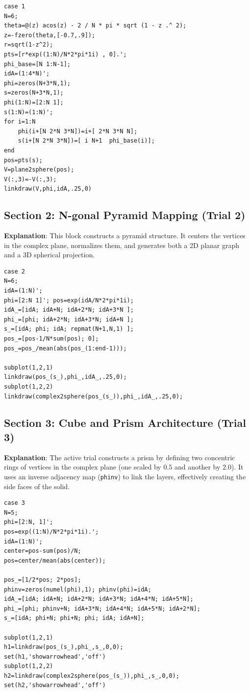 \begin{lstlisting}
case 1 
N=6; 
theta=@(z) acos(z) - 2 / N * pi * sqrt (1 - z .^ 2);
z=-fzero(theta,[-0.7,.9]);
r=sqrt(1-z^2);
pts=[r*exp((1:N)/N*2*pi*1i) , 0].';
phi_base=[N 1:N-1];
idA=(1:4*N)';
phi=zeros(N+3*N,1);
s=zeros(N+3*N,1);
phi(1:N)=[2:N 1];
s(1:N)=(1:N)';
for i=1:N
    phi(i+[N 2*N 3*N])=i+[ 2*N 3*N N];
    s(i+[N 2*N 3*N])=[ i N+1  phi_base(i)];
end
pos=pts(s);
V=plane2sphere(pos);
V(:,3)=-V(:,3);
linkdraw(V,phi,idA,.25,0)
\end{lstlisting}

\subsection{Section 2: N-gonal Pyramid Mapping (Trial 2)}
\textbf{Explanation}: This block constructs a pyramid structure. It centers the vertices in the complex plane, normalizes them, and generates both a 2D planar graph and a 3D spherical projection.

\begin{lstlisting}
case 2 
N=6;
idA=(1:N)';
phi=[2:N 1]'; pos=exp(idA/N*2*pi*1i);
idA_=[idA; idA+N; idA+2*N; idA+3*N ];
phi_=[phi; idA+2*N; idA+3*N; idA+N ];
s_=[idA; phi; idA; repmat(N+1,N,1) ];
pos_=[pos-1/N*sum(pos); 0];
pos_=pos_/mean(abs(pos_(1:end-1)));

subplot(1,2,1)
linkdraw(pos_(s_),phi_,idA_,.25,0);
subplot(1,2,2)
linkdraw(complex2sphere(pos_(s_)),phi_,idA_,.25,0);
\end{lstlisting}

\subsection{Section 3: Cube and Prism Architecture (Trial 3)}
\textbf{Explanation}: The active trial constructs a prism by defining two concentric rings of vertices in the complex plane (one scaled by $0.5$ and another by $2.0$). It uses an inverse adjacency map (\texttt{phinv}) to link the layers, effectively creating the side faces of the solid.

\begin{lstlisting}
case 3 
N=5;
phi=[2:N, 1]';
pos=exp((1:N)/N*2*pi*1i).';
idA=(1:N)';
center=pos-sum(pos)/N;
pos=center/mean(abs(center));

pos_=[1/2*pos; 2*pos];
phinv=zeros(numel(phi),1); phinv(phi)=idA;
idA_=[idA; idA+N; idA+2*N; idA+3*N; idA+4*N; idA+5*N];
phi_=[phi; phinv+N; idA+3*N; idA+4*N; idA+5*N; idA+2*N];
s_=[idA; phi+N; phi+N; phi; idA; idA+N];

subplot(1,2,1)
h1=linkdraw(pos_(s_),phi_,s_,0,0);
set(h1,'showarrowhead','off')
subplot(1,2,2)
h2=linkdraw(complex2sphere(pos_(s_)),phi_,s_,0,0);
set(h2,'showarrowhead','off')
\end{lstlisting}

